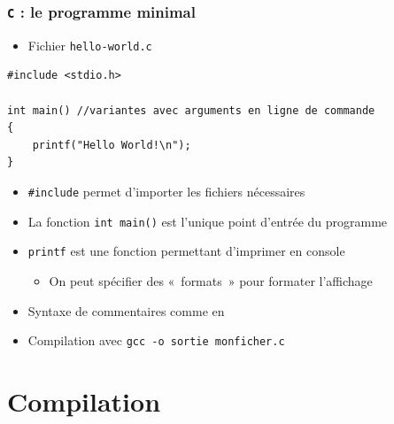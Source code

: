 \begin{frame}[containsverbatim]
\frametitle{\texttt{C} : le programme minimal}
\begin{itemize}
\item Fichier \texttt{hello-world.c}
\end{itemize}
\begin{lstlisting}
#include <stdio.h>

int main() //variantes avec arguments en ligne de commande
{
	printf("Hello World!\n");
}
\end{lstlisting}
\begin{itemize}
\item \lstinline|#include| permet d'importer les fichiers nécessaires
\item La fonction \lstinline|int main()| est l'unique point d'entrée du programme
\item \texttt{printf} est une fonction permettant d'imprimer en console
	\begin{itemize}
	\item On peut spécifier des «~formats~» pour formater l'affichage
	\end{itemize}
\item Syntaxe de commentaires comme en \java
\item Compilation avec \texttt{gcc -o sortie monficher.c}
\end{itemize}
\end{frame}

\section{Compilation}

